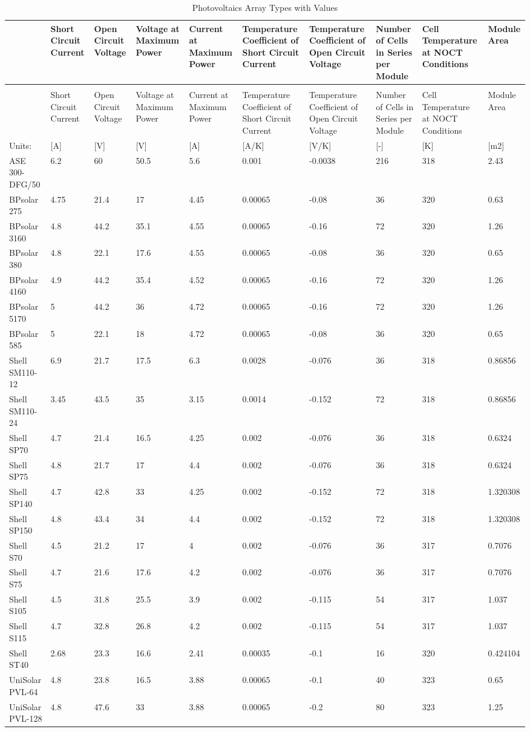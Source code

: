 \begin{longtable}[c]{p{0.6in}p{0.6in}p{0.6in}p{0.6in}p{0.6in}p{0.6in}p{0.6in}p{0.6in}p{0.6in}p{0.6in}}
\caption{Photovoltaics Array Types with Values \label{table:photovoltaics-array-types-with-values}} \tabularnewline
\toprule
 & Short Circuit Current & Open Circuit Voltage & Voltage at Maximum Power & Current at Maximum Power & Temperature Coefficient of Short Circuit Current & Temperature Coefficient of Open Circuit Voltage & Number of Cells in Series per Module & Cell Temperature at NOCT Conditions & Module Area \tabularnewline
\midrule
\endfirsthead

\caption[]{Photovoltaics Array Types with Values} \tabularnewline
\toprule
 & Short Circuit Current & Open Circuit Voltage & Voltage at Maximum Power & Current at Maximum Power & Temperature Coefficient of Short Circuit Current & Temperature Coefficient of Open Circuit Voltage & Number of Cells in Series per Module & Cell Temperature at NOCT Conditions & Module Area \tabularnewline
\midrule
\endhead

Units: & [A] & [V] & [V] & [A] & [A/K] & [V/K] & [-] & [K] & [m2] \tabularnewline
ASE 300-DFG/50 & 6.2 & 60 & 50.5 & 5.6 & 0.001 & -0.0038 & 216 & 318 & 2.43 \tabularnewline
BPsolar 275 & 4.75 & 21.4 & 17 & 4.45 & 0.00065 & -0.08 & 36 & 320 & 0.63 \tabularnewline
BPsolar 3160 & 4.8 & 44.2 & 35.1 & 4.55 & 0.00065 & -0.16 & 72 & 320 & 1.26 \tabularnewline
BPsolar 380 & 4.8 & 22.1 & 17.6 & 4.55 & 0.00065 & -0.08 & 36 & 320 & 0.65 \tabularnewline
BPsolar 4160 & 4.9 & 44.2 & 35.4 & 4.52 & 0.00065 & -0.16 & 72 & 320 & 1.26 \tabularnewline
BPsolar 5170 & 5 & 44.2 & 36 & 4.72 & 0.00065 & -0.16 & 72 & 320 & 1.26 \tabularnewline
BPsolar 585 & 5 & 22.1 & 18 & 4.72 & 0.00065 & -0.08 & 36 & 320 & 0.65 \tabularnewline
Shell SM110-12 & 6.9 & 21.7 & 17.5 & 6.3 & 0.0028 & -0.076 & 36 & 318 & 0.86856 \tabularnewline
Shell SM110-24 & 3.45 & 43.5 & 35 & 3.15 & 0.0014 & -0.152 & 72 & 318 & 0.86856 \tabularnewline
Shell SP70 & 4.7 & 21.4 & 16.5 & 4.25 & 0.002 & -0.076 & 36 & 318 & 0.6324 \tabularnewline
Shell SP75 & 4.8 & 21.7 & 17 & 4.4 & 0.002 & -0.076 & 36 & 318 & 0.6324 \tabularnewline
Shell SP140 & 4.7 & 42.8 & 33 & 4.25 & 0.002 & -0.152 & 72 & 318 & 1.320308 \tabularnewline
Shell SP150 & 4.8 & 43.4 & 34 & 4.4 & 0.002 & -0.152 & 72 & 318 & 1.320308 \tabularnewline
Shell S70 & 4.5 & 21.2 & 17 & 4 & 0.002 & -0.076 & 36 & 317 & 0.7076 \tabularnewline
Shell S75 & 4.7 & 21.6 & 17.6 & 4.2 & 0.002 & -0.076 & 36 & 317 & 0.7076 \tabularnewline
Shell S105 & 4.5 & 31.8 & 25.5 & 3.9 & 0.002 & -0.115 & 54 & 317 & 1.037 \tabularnewline
Shell S115 & 4.7 & 32.8 & 26.8 & 4.2 & 0.002 & -0.115 & 54 & 317 & 1.037 \tabularnewline
Shell ST40 & 2.68 & 23.3 & 16.6 & 2.41 & 0.00035 & -0.1 & 16 & 320 & 0.424104 \tabularnewline
UniSolar PVL-64 & 4.8 & 23.8 & 16.5 & 3.88 & 0.00065 & -0.1 & 40 & 323 & 0.65 \tabularnewline
UniSolar PVL-128 & 4.8 & 47.6 & 33 & 3.88 & 0.00065 & -0.2 & 80 & 323 & 1.25 \tabularnewline
\bottomrule
\end{longtable}

